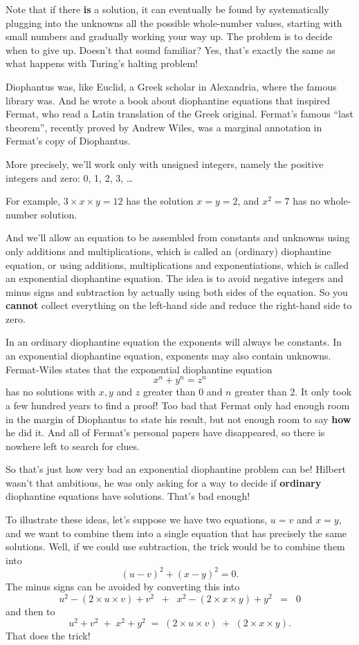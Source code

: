 \documentclass[12pt]{book}
\begin{document}
Note that if there \textbf{is} a solution, it can eventually be found by systematically plugging into
the unknowns all the possible whole-number values, starting with small numbers and gradually
working your way up.  The problem is to decide when to give up. Doesn't that sound familiar?
Yes, that's exactly the same as what happens with Turing's halting problem!

Diophantus was, like Euclid, a Greek scholar in Alexandria, where the famous library was.
And he wrote a book about diophantine equations
that inspired Fermat, who read a Latin translation of the
Greek original.  Fermat's famous ``last theorem'', recently proved by Andrew Wiles, was a marginal
annotation in Fermat's copy of Diophantus.

More precisely, we'll work only with unsigned integers, namely the positive integers and zero:
0, 1, 2, 3, \ldots

For example, $3 \times x \times y = 12$ has the solution $x = y = 2$, 
and $x^2 = 7$ has no whole-number solution.
 
And we'll allow an equation to be assembled from constants and unknowns using only additions
and multiplications, which is called an (ordinary) diophantine equation, or using additions,
multiplications and exponentiations, which is called an exponential diophantine equation.
The idea is to avoid negative integers and minus signs and subtraction by actually using both sides
of the equation. 
So you \textbf{cannot} collect 
everything on the left-hand side and reduce the right-hand side to zero.
 
In an ordinary diophantine equation the exponents will always be constants.
In an exponential diophantine equation, exponents may also contain unknowns.
Fermat-Wiles states that the exponential diophantine equation
\[
   x^n + y^n = z^n
\] 
has no solutions with $x, y$ and $z$ greater than 0 and $n$ greater than 2.
It only took a few hundred years to find a proof!  Too bad that Fermat
only had enough room in the margin of Diophantus to state his result,
but not enough room to say \textbf{how} he did it.
And all of Fermat's personal papers have disappeared, so there is nowhere left to search for clues.
 
So that's just how very bad an exponential diophantine problem can be!
Hilbert wasn't that ambitious, he was only asking for a way to decide if
\textbf{ordinary} diophantine equations have solutions.  That's bad enough!
 
To illustrate these ideas,
let's suppose we have two equations, $u = v$ and $x = y$, and we want to combine them into a single
equation that has precisely the same solutions.  Well, if we could use subtraction, the trick
would be to combine them into
\[
   (u - v)^2 + (x - y)^2 = 0.
\] 
The minus signs can be avoided by converting this into
\[
   u^2 - (2 \times u \times v) + v^2 \;\; + \;\;
   x^2 - (2 \times x \times y) + y^2 \;\; = \;\; 0
\] 
and then to
\[
   u^2 + v^2 \; + \;
   x^2 + y^2 \; = \; 
   (2 \times u \times v) \; + \;
   (2 \times x \times y).
\] 
That does the trick!
 
\end{document}
